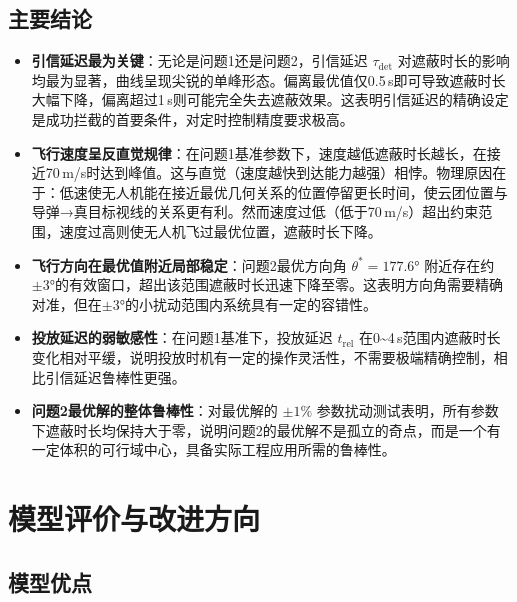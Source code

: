 \documentclass[12pt, a4paper]{article}
\begin{document}
\subsection{主要结论}

\begin{itemize}[leftmargin=2em]
  \item \textbf{引信延迟最为关键}：无论是问题1还是问题2，引信延迟 $\tau_{\mathrm{det}}$ 对遮蔽时长的影响均最为显著，曲线呈现尖锐的单峰形态。偏离最优值仅0.5\,s即可导致遮蔽时长大幅下降，偏离超过1\,s则可能完全失去遮蔽效果。这表明引信延迟的精确设定是成功拦截的首要条件，对定时控制精度要求极高。

  \item \textbf{飞行速度呈反直觉规律}：在问题1基准参数下，速度越低遮蔽时长越长，在接近70\,m/s时达到峰值。这与直觉（速度越快到达能力越强）相悖。物理原因在于：低速使无人机能在接近最优几何关系的位置停留更长时间，使云团位置与导弹→真目标视线的关系更有利。然而速度过低（低于70\,m/s）超出约束范围，速度过高则使无人机飞过最优位置，遮蔽时长下降。

  \item \textbf{飞行方向在最优值附近局部稳定}：问题2最优方向角 $\theta^*=177.6°$ 附近存在约$\pm3°$的有效窗口，超出该范围遮蔽时长迅速下降至零。这表明方向角需要精确对准，但在$\pm3°$的小扰动范围内系统具有一定的容错性。

  \item \textbf{投放延迟的弱敏感性}：在问题1基准下，投放延迟 $t_{\mathrm{rel}}$ 在0\textasciitilde{}4\,s范围内遮蔽时长变化相对平缓，说明投放时机有一定的操作灵活性，不需要极端精确控制，相比引信延迟鲁棒性更强。

  \item \textbf{问题2最优解的整体鲁棒性}：对最优解的 $\pm1\%$ 参数扰动测试表明，所有参数下遮蔽时长均保持大于零，说明问题2的最优解不是孤立的奇点，而是一个有一定体积的可行域中心，具备实际工程应用所需的鲁棒性。
\end{itemize}

\section{模型评价与改进方向}

\subsection{模型优点}
\end{document}
